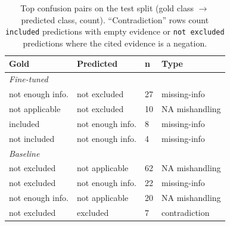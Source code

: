 \documentclass[conference]{IEEEtran}
\newcommand{\code}[1]{\texttt{\small #1}}
\begin{document}
\begin{table}[t]
\caption{Top confusion pairs on the test split
(gold class $\to$ predicted class, count). ``Contradiction'' rows
count \code{included} predictions with empty evidence or
\code{not excluded} predictions where the cited evidence is a
negation.}
\label{tab:confusions}
\centering
\small
\begin{tabular}{llll}
\toprule
\textbf{Gold} & \textbf{Predicted} & \textbf{n} & \textbf{Type}\\
\midrule
\multicolumn{4}{l}{\emph{Fine-tuned}}\\
not enough info. & not excluded & 27 & missing-info\\
not applicable & not excluded & 10 & NA mishandling\\
included & not enough info. & 8 & missing-info\\
not included & not enough info. & 4 & missing-info\\
\midrule
\multicolumn{4}{l}{\emph{Baseline}}\\
not excluded & not applicable & 62 & NA mishandling\\
not excluded & not enough info. & 22 & missing-info\\
not enough info. & not applicable & 20 & NA mishandling\\
not excluded & excluded & 7 & contradiction\\
\bottomrule
\end{tabular}
\end{table}
\end{document}
